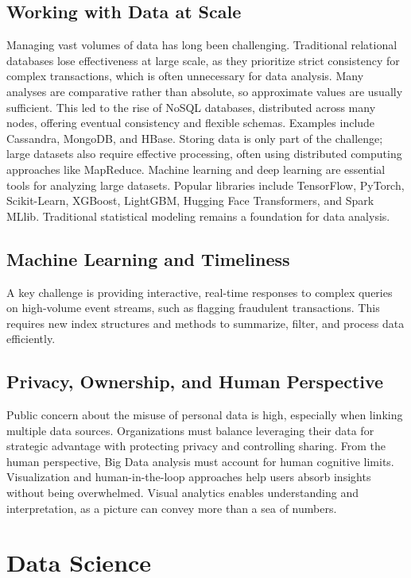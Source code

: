 \subsection{Working with Data at Scale}

Managing vast volumes of data has long been challenging. Traditional relational databases lose effectiveness at large scale, as they prioritize strict consistency for complex transactions, which is often unnecessary for data analysis. Many analyses are comparative rather than absolute, so approximate values are usually sufficient. This led to the rise of NoSQL databases, distributed across many nodes, offering eventual consistency and flexible schemas. Examples include Cassandra, MongoDB, and HBase. Storing data is only part of the challenge; large datasets also require effective processing, often using distributed computing approaches like MapReduce. Machine learning and deep learning are essential tools for analyzing large datasets. Popular libraries include TensorFlow, PyTorch, Scikit-Learn, XGBoost, LightGBM, Hugging Face Transformers, and Spark MLlib. Traditional statistical modeling remains a foundation for data analysis.


\subsection{Machine Learning and Timeliness}

A key challenge is providing interactive, real-time responses to complex queries on high-volume event streams, such as flagging fraudulent transactions. This requires new index structures and methods to summarize, filter, and process data efficiently.


\subsection{Privacy, Ownership, and Human Perspective}

Public concern about the misuse of personal data is high, especially when linking multiple data sources. Organizations must balance leveraging their data for strategic advantage with protecting privacy and controlling sharing. From the human perspective, Big Data analysis must account for human cognitive limits. Visualization and human-in-the-loop approaches help users absorb insights without being overwhelmed. Visual analytics enables understanding and interpretation, as a picture can convey more than a sea of numbers.


\section{Data Science}
